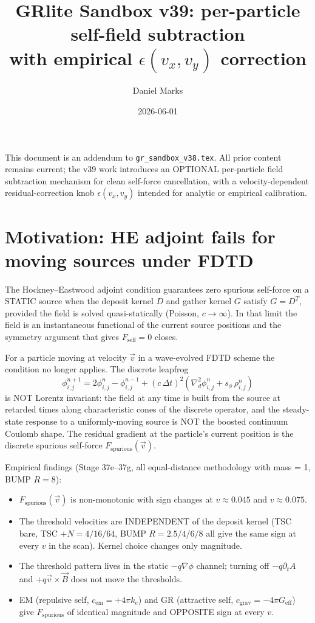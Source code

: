 \documentclass[11pt,a4paper]{article}
\title{\textbf{GRlite Sandbox v39}: per-particle self-field subtraction\\with empirical $\epsilon(v_x, v_y)$ correction}
\author{Daniel Marks}
\date{2026-06-01}
\begin{document}
\maketitle

This document is an addendum to \texttt{gr\_sandbox\_v38.tex}.  All
prior content remains current; the v39 work introduces an OPTIONAL
per-particle field subtraction mechanism for clean self-force
cancellation, with a velocity-dependent residual-correction knob
$\epsilon(v_x, v_y)$ intended for analytic or empirical calibration.

\section{Motivation: HE adjoint fails for moving sources under FDTD}

The Hockney–Eastwood adjoint condition guarantees zero spurious
self-force on a STATIC source when the deposit kernel $D$ and gather
kernel $G$ satisfy $G = D^T$, provided the field is solved
quasi-statically (Poisson, $c \to \infty$).  In that limit the field
is an instantaneous functional of the current source positions and
the symmetry argument that gives $F_{\mathrm{self}} = 0$ closes.

For a particle moving at velocity $\vec v$ in a wave-evolved FDTD
scheme the condition no longer applies.  The discrete leapfrog
\begin{equation}
\phi^{n+1}_{i,j} = 2\phi^n_{i,j} - \phi^{n-1}_{i,j}
 + (c\,\Delta t)^2 \left( \nabla^2_d \phi^n_{i,j}
                          + s_\phi \, \rho^n_{i,j} \right)
\label{eq:leapfrog}
\end{equation}
is NOT Lorentz invariant: the field at any time is built from the
source at retarded times along characteristic cones of the discrete
operator, and the steady-state response to a uniformly-moving source
is NOT the boosted continuum Coulomb shape.  The residual gradient
at the particle's current position is the discrete spurious
self-force $F_{\mathrm{spurious}}(\vec v)$.

Empirical findings (Stage 37e--37g, all equal-distance methodology
with mass = 1, BUMP $R=8$):
\begin{itemize}
  \item $F_{\mathrm{spurious}}(\vec v)$ is non-monotonic with sign
    changes at $v \approx 0.045$ and $v \approx 0.075$.
  \item The threshold velocities are INDEPENDENT of the deposit
    kernel (TSC bare, TSC $+ N=4/16/64$, BUMP $R=2.5/4/6/8$ all give
    the same sign at every $v$ in the scan).  Kernel choice changes
    only magnitude.
  \item The threshold pattern lives in the static $-q\nabla\phi$
    channel; turning off $-q\partial_t A$ and $+q \vec v \times \vec B$
    does not move the thresholds.
  \item EM (repulsive self, $c_{\mathrm{em}} = +4\pi k_e$) and GR
    (attractive self, $c_{\mathrm{grav}} = -4\pi G_{\mathrm{eff}}$)
    give $F_{\mathrm{spurious}}$ of identical magnitude and OPPOSITE
    sign at every $v$.
\end{itemize}
\end{document}
